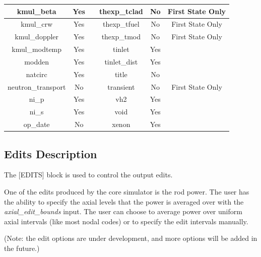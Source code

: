 \begin{table}[h]
{\begin{tabular}{|c|c|c||c|c|c|}
kmul\_beta             & Yes &                  & thexp\_tclad                      & No  & First State Only \\\hline
kmul\_crw              & Yes &                  & thexp\_tfuel                      & No  & First State Only \\\hline
kmul\_doppler          & Yes &                  & thexp\_tmod                       & No  & First State Only \\\hline
kmul\_modtemp          & Yes &                  & tinlet                            & Yes &                  \\\hline
modden                 & Yes &                  & tinlet\_dist                      & Yes &                  \\\hline
natcirc                & Yes &                  & title                             & No  &                  \\\hline
neutron\_transport     & No  &                  & transient                         & No  & First State Only \\\hline
ni\_p                  & Yes &                  & vh2                               & Yes &                  \\\hline
ni\_s                  & Yes &                  & void                              & Yes &                  \\\hline
op\_date               & No  &                  & xenon                             & Yes &                  \\\hline
    \end{tabular}
    }
    \label{tab:state-variable-persistence}
\end{table}

\FloatBarrier

\subsection{Edits Description}

The [EDITS] block is used to control the output edits.

One of the edits produced by the core simulator is the rod power.  The user has
the ability to specify the axial levels that the power is averaged over with
the {\it axial\_edit\_bounds} input.
The user can choose to average power over uniform axial intervals (like most nodal codes)
or to specify the edit intervals manually.

(Note: the edit options are under development, and more options will be added in the future.)

